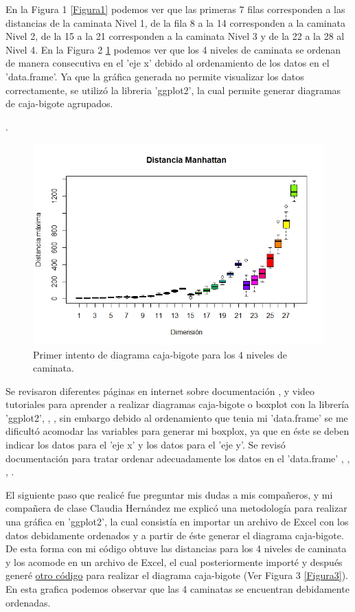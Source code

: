 \documentclass{article}
\begin{document}
En la Figura 1 \ref{Figura1} podemos ver que las primeras 7 filas corresponden a las distancias de la caminata Nivel 1, de la fila 8 a la 14 corresponden a la caminata Nivel 2, de la 15 a la 21 corresponden a la caminata Nivel 3 y de la 22 a la 28 al Nivel 4. En la  Figura 2 \ref{Figura2} podemos ver que los 4 niveles de caminata se ordenan de manera consecutiva en el 'eje x' debido al ordenamiento de los datos en el 'data.frame'. Ya que la gráfica generada no permite visualizar los datos correctamente, se utilizó la libreria 'ggplot2', la cual permite generar diagramas de caja-bigote agrupados.

\newpage
.
\bigskip
\bigskip

\begin{figure} [h!]%
    \centering
    \includegraphics[width=170mm]{Figura2.jpeg} %
    \caption{Primer intento de diagrama caja-bigote para los 4 niveles de caminata.}
    \label{Figura2}
\end{figure}

Se revisaron diferentes páginas en internet sobre documentación \citep{2}, \citep{3} y video tutoriales para aprender a realizar diagramas caja-bigote o boxplot con la librería 'ggplot2'\citep{8}, \citep{9}, \citep{10}, sin embargo debido al ordenamiento que tenia mi 'data.frame' se me dificultó acomodar las variables para generar mi boxplox, ya que en éste se deben indicar los datos para el 'eje x' y los datos para el 'eje y'. Se revisó documentación para tratar ordenar adecuadamente los datos en el 'data.frame' \citep{4}, \citep{5}, \citep{6}, \citep{7}.

\bigskip
El siguiente paso que realicé fue preguntar mis dudas a mis compañeros, y mi compañera de clase Claudia Hernández me explicó una metodología para realizar una gráfica en 'ggplot2', la cual consistía en importar un archivo de Excel con los datos debidamente ordenados y a partir de éste generar el diagrama caja-bigote. De esta forma con mi código obtuve las distancias para los 4 niveles de caminata y los acomode en un archivo de Excel, el cual posteriormente importé y después generé \href{https://github.com/nataliaperez0/Simulation/blob/main/Tarea1/Pruebas%20de%20codigo/Graficar%20con%20Excel%201.R}{otro código} para realizar el diagrama caja-bigote (Ver Figura 3 \ref{Figura3}). En esta grafica podemos observar que las 4 caminatas se encuentran debidamente ordenadas.
\bigskip
\end{document}
